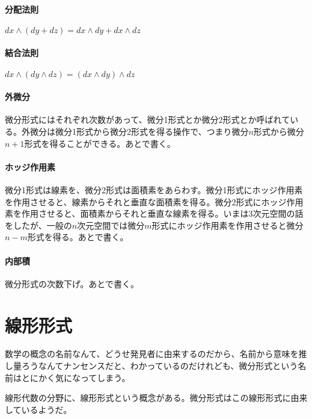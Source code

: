 \paragraph{分配法則}

$ d x \wedge ( d y + d z ) = d x \wedge d y + d x \wedge d z $

\paragraph{結合法則}

$ d x \wedge (d y \wedge d z) = (d x \wedge d y) \wedge d z $

\paragraph{外微分}

微分形式にはそれぞれ次数があって、微分1形式とか微分2形式とか呼ばれている。外微分は微分1形式から微分2形式を得る操作で、つまり微分$n$形式から微分$n+1$形式を得ることができる。あとで書く。

\paragraph{ホッジ作用素}

微分1形式は線素を、微分2形式は面積素をあらわす。微分1形式にホッジ作用素を作用させると、線素からそれと垂直な面積素を得る。微分2形式にホッジ作用素を作用させると、面積素からそれと垂直な線素を得る。いまは3次元空間の話をしたが、一般の$n$次元空間では微分$m$形式にホッジ作用素を作用させると微分$n-m$形式を得る。あとで書く。

\paragraph{内部積}

微分形式の次数下げ。あとで書く。


\section{線形形式}

数学の概念の名前なんて、どうせ発見者に由来するのだから、名前から意味を推し量ろうなんてナンセンスだと、わかっているのだけれども、微分形式という名前はとにかく気になってしまう。

線形代数の分野に、線形形式という概念がある。微分形式はこの線形形式に由来しているようだ。

